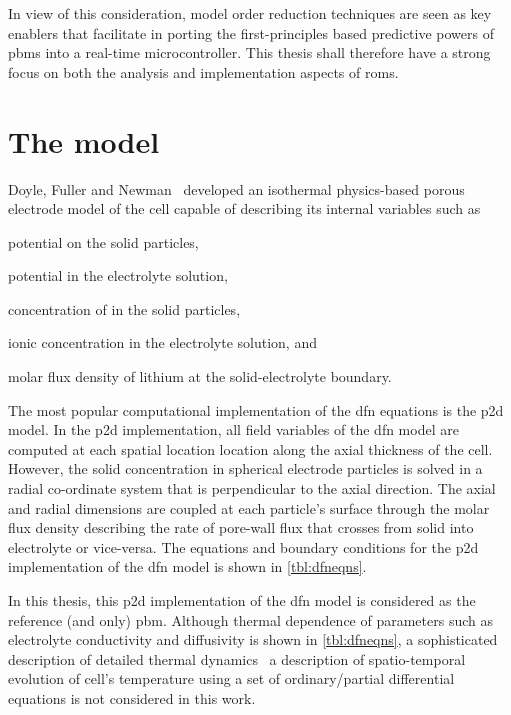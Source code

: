 In view of this consideration, model  order reduction techniques are seen as key
enablers that facilitate in porting the first-principles based predictive powers
of \glspl{pbm}  into a  real-time microcontroller.  This thesis  shall therefore
have  a  strong  focus  on  both the  analysis  and  implementation  aspects  of
\glspl{rom}.

\section{The  model}\label{sec:dfnmodel}

Doyle,  Fuller and  Newman~\cite{Doyle1993,Fuller1994}  developed an  isothermal
physics-based  porous electrode  model of  the  cell capable  of describing  its
internal variables such as
\begin{enumerate*}[label=\itshape\alph*\upshape)]
    \item potential on the solid particles,
    \item potential in the electrolyte solution,
    \item concentration of  in the solid particles,
    \item ionic concentration in the electrolyte solution, and
    \item molar flux density of lithium at the solid-electrolyte boundary.
\end{enumerate*}
The most popular computational implementation  of the \gls{dfn} equations is the
\gls{p2d} model.  In the  \gls{p2d} implementation, all  field variables  of the
\gls{dfn} model are  computed at each spatial location location  along the axial
thickness of the  cell. However, the solid concentration  in spherical electrode
particles is solved in a radial  co-ordinate system that is perpendicular to the
axial direction. The axial and radial  dimensions are coupled at each particle's
surface through  the molar flux  density describing  the rate of  pore-wall flux
that  crosses from  solid  into  electrolyte or  vice-versa.  The equations  and
boundary conditions for  the \gls{p2d} implementation of the  \gls{dfn} model is
shown in \cref{tbl:dfneqns}.



In  this  thesis,  this  \gls{p2d}  implementation of  the  \gls{dfn}  model  is
considered as  the reference (and  only) \gls{pbm}. Although  thermal dependence
of  parameters  such  as  electrolyte  conductivity  and  diffusivity  is  shown
in \cref{tbl:dfneqns}, a sophisticated description  of detailed thermal dynamics
\ie~a description  of spatio-temporal evolution of cell's  temperature using a
set of ordinary/partial  differential equations is not considered  in this work.

